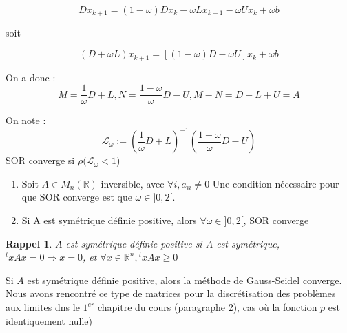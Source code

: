 \documentclass[a4paper,11pt]{article}
\newcommand{\R}{\mathbb{R}}
\theoremstyle{plain} %
\newtheorem{rappel}{Rappel}
\begin{document}
\[
    Dx_{k+1}=(1-\omega)Dx_k - \omega L x_{k+1} - \omega U x_k + \omega b
\]

soit

\[
    (D + \omega L)x_{k+1} = [(1-\omega)D - \omega U]x_k + \omega b
\]

On a donc : 
\[
    M = \frac{1}{\omega}D + L, N = \frac{1-\omega}{\omega}D - U, M-N=D+L+U=A
\]

On note :
\[
    \mathcal{L}_{\omega} := (\frac{1}{\omega}D + L)^{-1}(\frac{1-\omega}{\omega}D - U)
\]
SOR converge si $\rho(\mathcal{L}_{\omega}<1$)

\begin{ftheo}[demo en TD]
    \begin{enumerate}
        \item
            Soit $A \in M_n(\R)$ inversible, avec $\forall i, a_{ii} \ne 0$
            Une condition nécessaire pour que SOR converge est que $\omega \in ]0,2[$.

        \item
            Si A est symétrique définie positive, alors $\forall \omega \in ]0,2[$, SOR converge 
    \end{enumerate}
\end{ftheo}

\begin{rappel}
    $A$ est symétrique définie positive si $A$ est symétrique, $^txAx = 0 \Rightarrow x = 0$, et $\forall x \in \R^n, {}^t\!xAx \geq 0$
\end{rappel}

\begin{coroll}
    Si $A$ est symétrique définie positive, alors la méthode de Gauss-Seidel converge.
    Nous avons rencontré ce type de matrices pour la discrétisation des problèmes aux limites dns le $1^{er}$ chapitre du cours (paragraphe 2), cas où la fonction $p$ est identiquement nulle)
\end{coroll}
\end{document}
